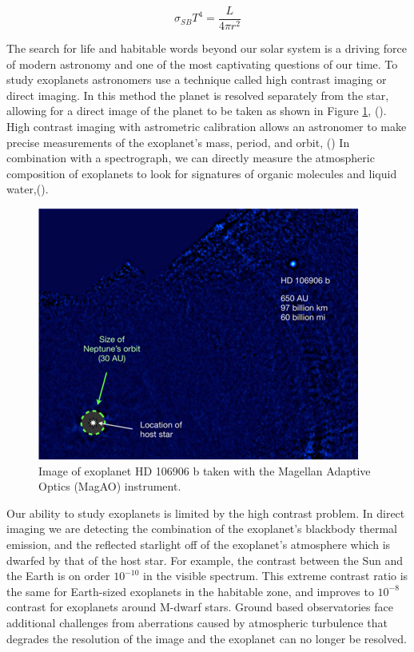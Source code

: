 \begin{equation}
    \sigma_{SB}T^4=\frac{L}{4\pi r^2} 
    \label{HabitableZone}
\end{equation}

The search for life and habitable words beyond our solar system is a driving force of modern astronomy and one of the most captivating questions of our time. To study exoplanets astronomers use a technique called high contrast imaging or direct imaging. In this method the planet is resolved separately from the star, allowing for a direct image of the planet to be taken as shown in Figure \ref{fig:exoplanets}, (\cite{bailey2013hd}). High contrast imaging with astrometric calibration allows an astronomer to make precise measurements of the exoplanet’s mass, period, and orbit, (\cite{seager2010exoplanets}) In combination with a spectrograph, we can directly measure the atmospheric composition of exoplanets to look for signatures of organic molecules and liquid water,(\cite{seager2015search}).   

\begin{figure}
    \centering
    \includegraphics{Chapter Materials/Introduction Materials/Introduction Figures/HCexoplanet.png}
    \caption{Image of exoplanet HD 106906 b taken with the Magellan Adaptive Optics (MagAO) instrument. \cite{bailey2013hd}}
    \label{fig:exoplanets}
\end{figure}

Our ability to study exoplanets is limited by the high contrast problem. In direct imaging we are detecting the combination of the exoplanet’s blackbody thermal emission, and the reflected starlight off of the exoplanet’s atmosphere\cite{seager2010exoplanets} which is dwarfed by that of the host star. For example, the contrast between the Sun and the Earth is on order $10^{-10}$ in the visible spectrum. This extreme contrast ratio is the same for Earth-sized exoplanets in the habitable zone, and improves to $10^{-8}$ contrast for exoplanets around M-dwarf stars.\cite{males2014direct} Ground based observatories face additional challenges from aberrations caused by atmospheric turbulence that degrades the resolution of the image and the exoplanet can no longer be resolved.

